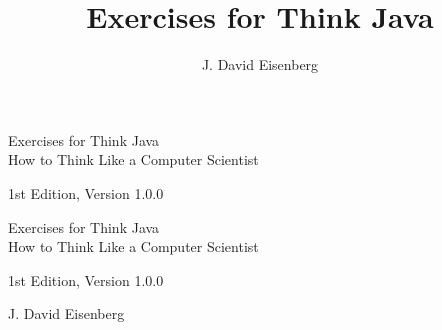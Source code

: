 \documentclass[12pt]{book}
\title{Exercises for Think Java}
\author{J. David Eisenberg}
\newcommand{\thetitle}{Exercises for Think Java}
\newcommand{\thesubtitle}{How to Think Like a Computer Scientist}
\newcommand{\theauthors}{J. David Eisenberg}
\newcommand{\theversion}{1st Edition, Version 1.0.0}
\theoremstyle{exercise}
\newif\ifplastex
\begin{document}
\frontmatter

\ifplastex

\maketitle

\else

\begin{latexonly}

\thispagestyle{empty}

\begin{flushright}
\vspace*{2.0in}

\begin{spacing}{3}
{\huge \thetitle} \\
{\Large \thesubtitle}
\end{spacing}

\vspace{0.25in}

\theversion

\vfill
\end{flushright}

\newpage
\thispagestyle{empty}

\quad

\newpage
\thispagestyle{empty}

\begin{flushright}
\vspace*{2.0in}

\begin{spacing}{3}
{\huge \thetitle} \\
{\Large \thesubtitle}
\end{spacing}

\vspace{0.25in}

\theversion

\vspace{1in}

{\Large \theauthors}




\vfill
\end{flushright}


\end{latexonly}
\end{document}
